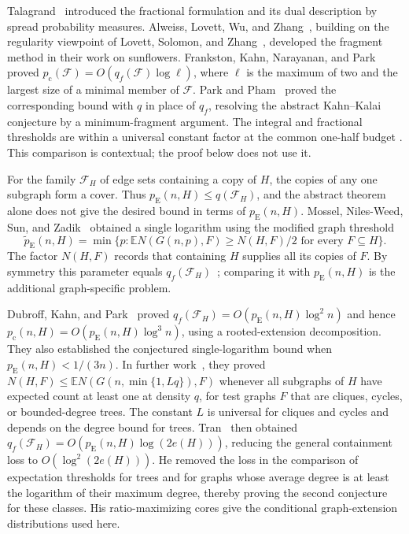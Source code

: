 \documentclass[11pt]{article}
\numberwithin{equation}{section}
\newcommand{\EE}{\mathbb E}
\newcommand{\pc}{p_{\mathrm c}}
\newcommand{\pE}{p_{\mathrm E}}
\begin{document}
Talagrand~\cite[Section~6]{Tal10} introduced the fractional formulation
and its dual description by spread probability measures.
Alweiss, Lovett, Wu, and Zhang~\cite{ALWZ21}, building on the regularity
viewpoint of Lovett, Solomon, and Zhang~\cite{LSZ19}, developed the
fragment method in their work on sunflowers. Frankston, Kahn,
Narayanan, and Park~\cite{FKNP21} proved
$p_{\mathrm c}(\mathcal F)=O(q_f(\mathcal F)\log\ell)$, where $\ell$
is the maximum of two and the largest size of a minimal member of
$\mathcal F$. Park and Pham~\cite{PP24} proved the corresponding
bound with $q$ in place of $q_f$, resolving the abstract Kahn--Kalai
conjecture by a minimum-fragment argument.
The integral and fractional thresholds are within a universal constant
factor at the common one-half budget
\cite[Theorem~1.1]{OpenAIThresholdEquivalence2026}.
This comparison is contextual; the proof below does not use it.

For the family $\mathcal F_H$ of edge sets containing a copy of $H$,
the copies of any one subgraph form a cover. Thus
$\pE(n,H)\le q(\mathcal F_H)$, and the abstract theorem alone does
not give the desired bound in terms of $\pE(n,H)$.
Mossel, Niles-Weed, Sun, and Zadik~\cite[Theorem~1]{MNSZ22} obtained
a single logarithm using the modified graph threshold
\[
 \widetilde p_{\mathrm E}(n,H)
 =\min\{p:\EE N(G(n,p),F)\ge N(H,F)/2
                  \text{ for every }F\subseteq H\}.
\]
The factor $N(H,F)$ records that containing $H$ supplies all its
copies of $F$. By symmetry this parameter equals
$q_f(\mathcal F_H)$~\cite[Equation~(1)]{DKP25}; comparing it with
$\pE(n,H)$ is the additional graph-specific problem.

Dubroff, Kahn, and Park~\cite[Theorems~1.2--1.5]{DKP25} proved
$q_f(\mathcal F_H)=O(\pE(n,H)\log^2 n)$ and hence
$\pc(n,H)=O(\pE(n,H)\log^3 n)$, using a rooted-extension
decomposition. They also established the conjectured single-logarithm
bound when $\pE(n,H)<1/(3n)$.
In further work~\cite[Theorems~1.4--1.5]{DKP25Cases}, they proved
$N(H,F)\le\EE N(G(n,\min\{1,Lq\}),F)$ whenever all subgraphs of $H$ have
expected count at least one at density $q$, for test graphs $F$ that
are cliques, cycles, or bounded-degree trees. The constant $L$ is
universal for cliques and cycles and depends on the degree bound
for trees.
Tran~\cite{Tran26} then obtained
$q_f(\mathcal F_H)=O(\pE(n,H)\log(2e(H)))$, reducing the general
containment loss to $O(\log^2(2e(H)))$. He removed the loss in the
comparison of expectation thresholds for trees and for graphs whose
average degree is at least the logarithm of their maximum degree,
thereby proving the second conjecture for these classes.
His ratio-maximizing cores give the conditional graph-extension
distributions used here.
\end{document}
